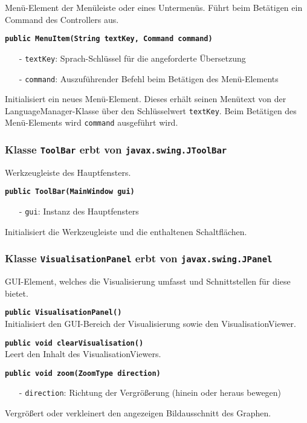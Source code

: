 \documentclass[parskip=full,11pt,twoside]{scrartcl}
\begin{document}
Menü-Element der Menüleiste oder eines Untermenüs. Führt beim Betätigen ein Command des Controllers aus.

\textbf{\texttt{public MenuItem(String textKey, Command command)}}
\begin{itemize}[noitemsep]
	\item[-] \texttt{textKey}: Sprach-Schlüssel für die angeforderte Übersetzung
	\item[-] \texttt{command}: Auszuführender Befehl beim Betätigen des Menü-Elements
\end{itemize}
Initialisiert ein neues Menü-Element. Dieses erhält seinen Menütext von der LanguageManager-Klasse über den Schlüsselwert \texttt{textKey}. Beim Betätigen des Menü-Elements wird \texttt{command} ausgeführt wird.

\subsubsection{Klasse \texttt{ToolBar} erbt von \texttt{javax.swing.JToolBar}}

Werkzeugleiste des Hauptfensters.

\textbf{\texttt{public ToolBar(MainWindow gui)}}
\begin{itemize}[noitemsep]
	\item[-] \texttt{gui}: Instanz des Hauptfensters
\end{itemize}
Initialisiert die Werkzeugleiste und die enthaltenen Schaltflächen.

\subsubsection{Klasse \texttt{VisualisationPanel} erbt von \texttt{javax.swing.JPanel}}

GUI-Element, welches die Visualisierung umfasst und Schnittstellen für diese bietet.

\textbf{\texttt{public VisualisationPanel()}}\\
Initialisiert den GUI-Bereich der Visualisierung sowie den VisualisationViewer.

\textbf{\texttt{public void clearVisualisation()}}\\
Leert den Inhalt des VisualisationViewers.

\textbf{\texttt{public void zoom(ZoomType direction)}}
\begin{itemize}[noitemsep]
	\item[-] \texttt{direction}: Richtung der Vergrößerung (hinein oder heraus bewegen)
\end{itemize}
Vergrößert oder verkleinert den angezeigen Bildausschnitt des Graphen.
\end{document}
